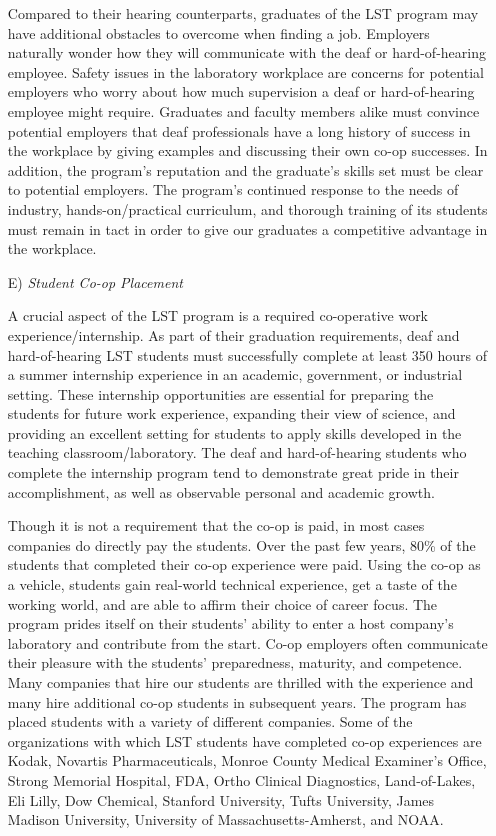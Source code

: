 \documentclass[11.5pt]{sig-alternate} %
\begin{document}
\begin{large}
\begin{enumerate}
\begin{sloppypar}
    Compared to their hearing counterparts, graduates of the LST program may have additional obstacles to overcome when finding a job. Employers naturally wonder how they will communicate with the deaf or hard-of-hearing employee. Safety issues in the laboratory workplace are concerns for potential employers who worry about how much supervision a deaf or hard-of-hearing employee might require. Graduates and faculty members alike must convince potential employers that deaf professionals have a long history of success in the workplace by giving examples and discussing their own co-op successes. In addition, the program’s reputation and the graduate’s skills set must be clear to potential employers. The program’s continued response to the needs of industry, hands-on/practical curriculum, and thorough training of its students must remain in tact in order to give our graduates a competitive advantage in the workplace.\end{sloppypar}
    \item[E)] \textit{Student Co-op Placement}
    \begin{sloppypar}A crucial aspect of the LST program is a required co-operative work experience/internship. As part of their graduation requirements, deaf and hard-of-hearing LST students must successfully complete at least 350 hours of a summer internship experience in an academic, government, or industrial setting. These internship opportunities are essential for preparing the students for future work experience, expanding their view of science, and providing an excellent setting for students to apply skills developed in the teaching classroom/laboratory. The deaf and hard-of-hearing students who complete the internship program tend to demonstrate great pride in their accomplishment, as well as observable personal and academic growth.

    Though it is not a requirement that the co-op is paid, in most cases companies do directly pay the students. Over the past few years, 80\% of the students that completed their co-op experience were paid. Using the co-op as a vehicle, students gain real-world technical experience, get a taste of the working world, and are able to affirm their choice of career focus. The program prides itself on their students’ ability to enter a host company’s laboratory and contribute from the start. Co-op employers often communicate their pleasure with the students’ preparedness, maturity, and competence. Many companies that hire our students are thrilled with the experience and many hire additional co-op students in subsequent years. The program has placed students with a variety of different companies. Some of the organizations with which LST students have completed co-op experiences are Kodak, Novartis Pharmaceuticals, Monroe County Medical Examiner’s Office, Strong Memorial Hospital, FDA, Ortho Clinical Diagnostics, Land-of-Lakes, Eli Lilly, Dow Chemical, Stanford University, Tufts University, James Madison University, University of Massachusetts-Amherst, and NOAA.


\end{sloppypar}
\end{enumerate}
\end{large}
\end{document}
